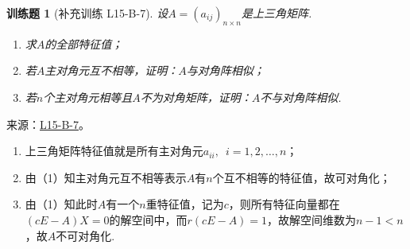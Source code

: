 \documentclass[UTF8,12pt,a4paper,fontset=fandol]{ctexart}
\newtheorem{exercise}{训练题}[section]
\begin{document}
\begin{exercise}[补充训练 L15-B-7]\label{prob:L15-B-7}
设$A=(a_{ij})_{n\times n}$是上三角矩阵.
        \begin{enumerate}
            \item 求$A$的全部特征值；

            \item 若$A$主对角元互不相等，证明：$A$与对角阵相似；

            \item 若$n$个主对角元相等且$A$不为对角矩阵，证明：$A$不与对角阵相似.
        \end{enumerate}
\end{exercise}
\noindent 来源：\href{https://github.com/yhwu-is/Linear-Algebra-Left-Undone/blob/new/%E8%AE%B2%E4%B9%89/%E4%B8%93%E9%A2%98/15%20%E7%9B%B8%E4%BC%BC%E6%A0%87%E5%87%86%E5%BD%A2%EF%BC%9A%E5%A4%8D%E6%95%B0%E5%9F%9F%E4%B8%8A%E7%9A%84%E5%B0%9D%E8%AF%95%E4%B8%8E%E7%90%86%E8%AE%BA.tex}{L15-B-7}。
\begin{solve}
\begin{enumerate}
                \item 上三角矩阵特征值就是所有主对角元$a_{ii},\enspace i=1,2,\ldots,n$；

                \item 由（1）知主对角元互不相等表示$A$有$n$个互不相等的特征值，故可对角化；

                \item 由（1）知此时$A$有一个$n$重特征值，记为$c$，则所有特征向量都在$(cE-A)X=0$的解空间中，而$r(cE-A)=1$，故解空间维数为$n-1<n$，故$A$不可对角化.
            \end{enumerate}
\end{solve}
\end{document}
